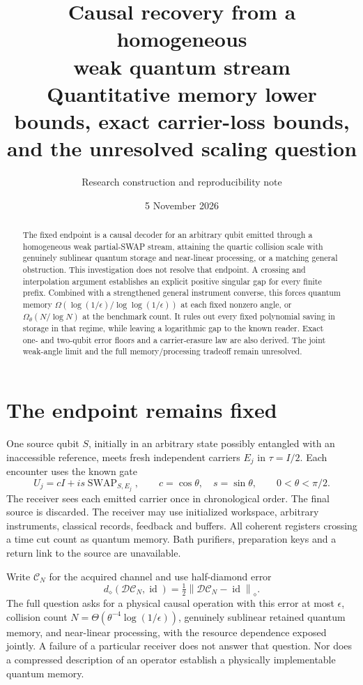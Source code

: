 \documentclass[11pt,a4paper]{article}
\title{\vspace{-1em}Causal recovery from a homogeneous\\weak quantum stream\\[.45em]\large Quantitative memory lower bounds, exact carrier-loss bounds,\\and the unresolved scaling question}
\author{Research construction and reproducibility note}
\date{5 November 2026}
\newcommand{\id}{\operatorname{id}}
\newcommand{\SWAP}{\operatorname{SWAP}}
\newcommand{\dd}{d_\diamond}
\newcommand{\norm}[1]{\left\lVert#1\right\rVert}
\begin{document}
\maketitle
\begin{abstract}
The fixed endpoint is a causal decoder for an arbitrary qubit emitted through a homogeneous weak partial-SWAP stream, attaining the quartic collision scale with genuinely sublinear quantum storage and near-linear processing, or a matching general obstruction. This investigation does not resolve that endpoint. A crossing and interpolation argument establishes an explicit positive singular gap for every finite prefix. Combined with a strengthened general instrument converse, this forces quantum memory $\Omega(\log(1/\epsilon)/\log\log(1/\epsilon))$ at each fixed nonzero angle, or $\Omega_\theta(N/\log N)$ at the benchmark count. It rules out every fixed polynomial saving in storage in that regime, while leaving a logarithmic gap to the known reader. Exact one- and two-qubit error floors and a carrier-erasure law are also derived. The joint weak-angle limit and the full memory/processing tradeoff remain unresolved.
\end{abstract}

\section{The endpoint remains fixed}
One source qubit $S$, initially in an arbitrary state possibly entangled with an inaccessible reference, meets fresh independent carriers $E_j$ in $\tau=I/2$. Each encounter uses the known gate
\[
 U_j=cI+is\SWAP_{S,E_j},\qquad c=\cos\theta,\quad s=\sin\theta,\qquad 0<\theta<\pi/2.
\]
The receiver sees each emitted carrier once in chronological order. The final source is discarded. The receiver may use initialized workspace, arbitrary instruments, classical records, feedback and buffers. All coherent registers crossing a time cut count as quantum memory. Bath purifiers, preparation keys and a return link to the source are unavailable.

Write $\mathcal C_N$ for the acquired channel and use half-diamond error
\[
 \dd(\mathcal D\mathcal C_N,\id)=\tfrac12\norm{\mathcal D\mathcal C_N-\id}_\diamond.
\]
The full question asks for a physical causal operation with this error at most $\epsilon$, collision count $N=\Theta(\theta^{-4}\log(1/\epsilon))$, genuinely sublinear retained quantum memory, and near-linear processing, with the resource dependence exposed jointly. A failure of a particular receiver does not answer that question. Nor does a compressed description of an operator establish a physically implementable quantum memory.
\end{document}
